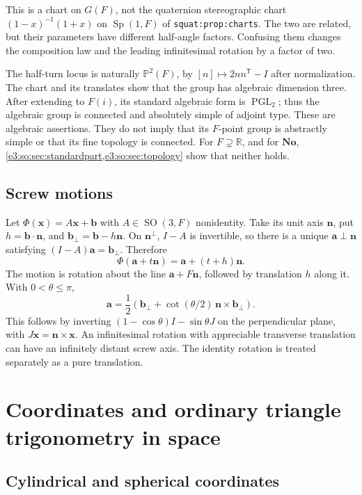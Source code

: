 \documentclass[11pt,letterpaper]{article}
\numberwithin{equation}{section}
\theoremstyle{definition}
\theoremstyle{remark}
\newcommand{\No}{\mathbf{No}}
\newcommand{\R}{\mathbb R}
\newcommand{\SO}{\operatorname{SO}}
\newcommand{\Sp}{\operatorname{Sp}}
\newcommand{\vv}[1]{\bm{#1}}
\newcommand{\transpose}{^{\mathsf T}}
\begin{document}
This is a chart on $G(F)$, not the quaternion stereographic chart
$(1-x)^{-1}(1+x)$ on $\Sp(1,F)$ of \texttt{squat:prop:charts}. The two are
related, but their parameters have different half-angle factors. Confusing them
changes the composition law and the leading infinitesimal rotation by a factor
of two.

The half-turn locus is naturally $\mathbb P^2(F)$, by $[n]\mapsto2nn\transpose-I$
after normalization. The chart and its translates show that the group has
algebraic dimension three. After extending to $F(i)$, its standard algebraic
form is $\operatorname{PGL}_2$; thus the algebraic group is connected and
absolutely simple of adjoint type. These are algebraic assertions. They do not
imply that its $F$-point group is abstractly simple or that its fine topology
is connected. For $F\supsetneq\R$, and for $\No$,
\cref{e3:so:sec:standardpart,e3:so:sec:topology} show that neither holds.

\subsection{Screw motions}

Let $\Phi(\vv x)=A\vv x+\vv b$ with $A\in\SO(3,F)$ nonidentity. Take its
unit axis $\vv n$, put $h=\vv b\cdot\vv n$, and
$\vv b_\perp=\vv b-h\vv n$. On $\vv n^\perp$, $I-A$ is invertible, so
there is a unique $\vv a\perp\vv n$ satisfying
$(I-A)\vv a=\vv b_\perp$. Therefore
\[
 \Phi(\vv a+t\vv n)=\vv a+(t+h)\vv n.
\]
The motion is rotation about the line $\vv a+F\vv n$, followed by translation
$h$ along it. With $0<\theta\le\pi$,
\begin{equation}\label{e3:eq:screwaxis}
 \vv a=\frac12\left(\vv b_\perp+
       \cot(\theta/2)\,\vv n\times\vv b_\perp\right).
\end{equation}
This follows by inverting $(1-\cos\theta)I-\sin\theta J$ on the perpendicular
plane, with $J\vv x=\vv n\times\vv x$. An infinitesimal rotation with appreciable
transverse translation can have an infinitely distant screw axis. The identity
rotation is treated separately as a pure translation.

\section{Coordinates and ordinary triangle trigonometry in space}\label{e3:sec:coordinates}

\subsection{Cylindrical and spherical coordinates}
\end{document}
